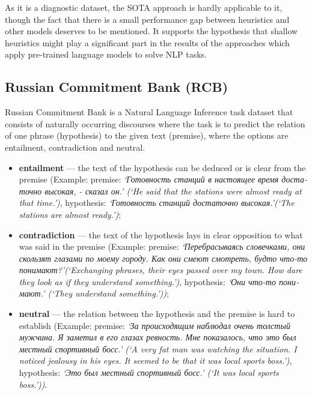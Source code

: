 \documentclass[11pt]{article}
\begin{document}
As it is a diagnostic dataset, the SOTA approach is hardly applicable to it, though the fact that there is a small performance gap between heuristics and other models deserves to be mentioned. It supports the hypothesis that shallow heuristics might play a significant part in the results of the approaches which apply pre-trained language models to solve NLP tasks.

\subsection{Russian Commitment Bank (RCB)}

Russian Commitment Bank is a Natural Language Inference task dataset that consists of naturally occurring discourses where the task is to predict the relation of one phrase (hypothesis) to the given text (premise), where the options are entailment, contradiction and neutral. 

\begin{flushleft}
\begin{itemize}
\item \textbf{entailment} --- the text of the hypothesis can be deduced or is clear from the premise (Example: premise: \emph{\foreignlanguage{russian}{`Готовность станций в настоящее время достаточно высокая, - сказал он.'} (`He said that the stations were almost ready at that time.')}, hypothesis: \emph{\foreignlanguage{russian}{`Готовность станций достаточно высокая.'}(`The stations are almost ready.')}; 

\item \textbf{contradiction} --- the text of the hypothesis lays in clear opposition to what was said in the premise (Example: premise: \emph{\foreignlanguage{russian}{`Перебрасываясь словечками, они скользят глазами по моему городу. Как они смеют смотреть, будто что-то понимают?'}(`Exchanging phrases, their eyes passed over my town. How dare they look as if they understand something.')}, hypothesis: \emph{\foreignlanguage{russian}{`Они что-то понимают.'} (`They understand something.'))};

\item \textbf{neutral} --- the relation between the hypothesis and the premise is hard to establish (Example: premise: \emph{\foreignlanguage{russian}{`За происходящим наблюдал очень толстый мужчина. Я заметил в его глазах ревность. Мне показалось, что это был местный спортивный босс.'} (`A very fat man was watching the situation. I noticed jealousy in his eyes. It seemed to be that it was local sports boss.')}, hypothesis: \emph{\foreignlanguage{russian}{`Это был местный спортивный босс.'} (`It was local sports boss.'))}. 
\end{itemize}

\end{flushleft}
\end{document}
